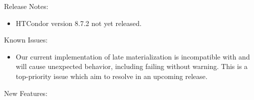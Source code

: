 \noindent Release Notes:

\begin{itemize}

\item HTCondor version 8.7.2 not yet released.

\end{itemize}

\noindent Known Issues:

\begin{itemize}

\item Our current implementation of late materialization is incompatible with
 and will cause unexpected behavior, including failing without
warning. This is a top-priority issue which aim to resolve in an upcoming
release.

\end{itemize}

\noindent New Features:

